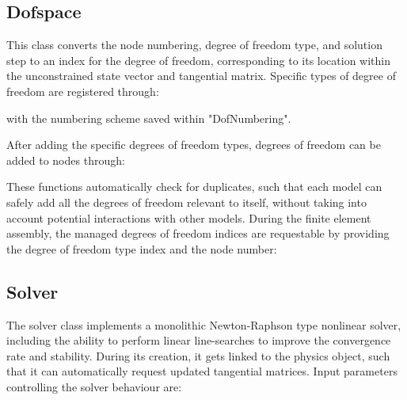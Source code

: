\documentclass[3p]{elsarticle} %
\begin{document}
\subsection{Dofspace}
This class converts the node numbering, degree of freedom type, and solution step to an index for the degree of freedom, corresponding to its location within the unconstrained state vector and tangential matrix. Specific types of degree of freedom are registered through:

with the numbering scheme saved within "DofNumbering".

After adding the specific degrees of freedom types, degrees of freedom can be added to nodes through:

These functions automatically check for duplicates, such that each model can safely add all the degrees of freedom relevant to itself, without taking into account potential interactions with other models. During the finite element assembly, the managed degrees of freedom indices are requestable by providing the degree of freedom type index and the node number:


\subsection{Solver}
The solver class implements a monolithic Newton-Raphson type nonlinear solver, including the ability to perform linear line-searches to improve the convergence rate and stability. During its creation, it gets linked to the physics object, such that it can automatically request updated tangential matrices. Input parameters controlling the solver behaviour are:

\end{document}
